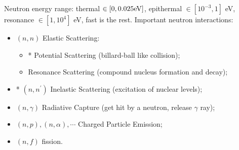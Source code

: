 \documentclass{school-22.101-notes}
\begin{document}
\clearpage
Neutron energy range: thermal $\in [0, 0.025 \mathrm{eV}]$, epithermal $\in [10^{-3}, 1]$ eV, resonance $\in [1, 10^4]$ eV, fast is the rest. Important neutron interactions:
    \begin{itemize}
    \item $(n,n)$ Elastic Scattering: 
        \begin{itemize}
        \item* Potential Scattering (billard-ball like collision);
        \item Resonance Scattering (compound nucleus formation and decay);
        \end{itemize}
    \item* $(n,n^{\prime})$ Inelastic Scattering (excitation of nuclear levels);
    \item $(n, \gamma)$ Radiative Capture (get hit by a neutron, release $\gamma$ ray);
    \item $(n, p), (n,\alpha), \cdots$ Charged Particle Emission;
    \item $(n, f)$ fission.     
    \end{itemize}
\end{document}
